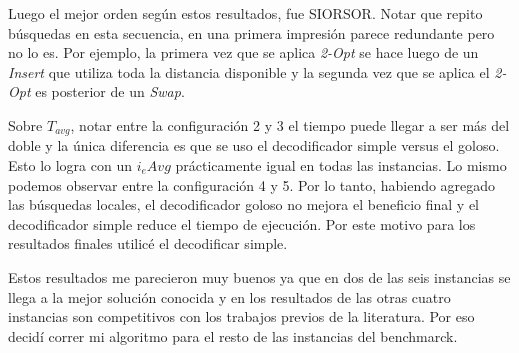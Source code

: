 \bigskip

Luego el mejor orden según estos resultados, fue SIORSOR. Notar que repito búsquedas en esta secuencia, en una primera impresión parece redundante pero no lo es. Por ejemplo, la primera vez que se aplica \textit{2-Opt} se hace luego de un \textit{Insert} que utiliza toda la distancia disponible y la segunda vez que se aplica el \textit{2-Opt} es posterior de un \textit{Swap}.

\bigskip

Sobre $T_{avg}$, notar entre la configuración 2 y 3 el tiempo puede llegar a ser más del doble y la única diferencia es que se uso el decodificador simple versus el goloso. Esto lo logra con un $i_eAvg$ prácticamente igual en todas las instancias. Lo mismo podemos observar entre la configuración 4 y 5. Por lo tanto, habiendo agregado las búsquedas locales, el decodificador goloso no mejora el beneficio final y el decodificador simple reduce el tiempo de ejecución. Por este motivo para los resultados finales utilicé el decodificar simple.

\bigskip

Estos resultados me parecieron muy buenos ya que en dos de las seis instancias se llega a la mejor solución conocida y en los resultados de las otras cuatro instancias son competitivos con los trabajos previos de la literatura. Por eso decidí correr mi algoritmo para el resto de las instancias del benchmarck.


